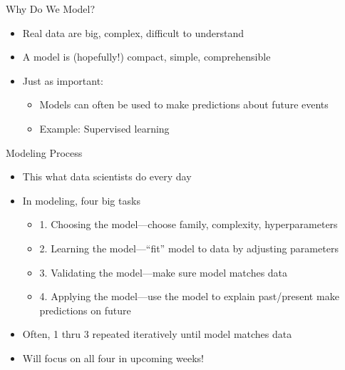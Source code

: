 \documentclass[aspectratio=169]{beamer}
\begin{document}
\begin{frame}{Why Do We Model?}

\begin{itemize}
\item Real data are big, complex, difficult to understand
\item A model is (hopefully!) compact, simple, comprehensible
\end{itemize}

\begin{itemize}
\item Just as important:
\begin{itemize}
	\item Models can often be used to make predictions about future events
	\item Example: Supervised learning
\end{itemize}
\end{itemize}
\end{frame}
\begin{frame}{Modeling Process}

\begin{itemize}
\item This what data scientists do every day
\item In modeling, four big tasks
	\begin{itemize}
	\item 1. Choosing the model---choose family, complexity, hyperparameters
	\item 2. Learning the model---``fit'' model to data by adjusting parameters
	\item 3. Validating the model---make sure model matches data
	\item 4. Applying the model---use the model to explain past/present make predictions on future
	\end{itemize}
\item Often, 1 thru 3 repeated iteratively until model matches data
\item Will focus on all four in upcoming weeks!
\end{itemize}
\end{frame}
\end{document}
